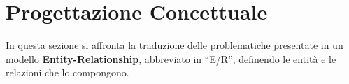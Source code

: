 \chapter{Progettazione Concettuale}
In questa sezione si affronta la traduzione delle problematiche presentate in un
modello \textbf{Entity-Relationship}, abbreviato in ``E/R'', definendo le entità
e le relazioni che lo compongono.



